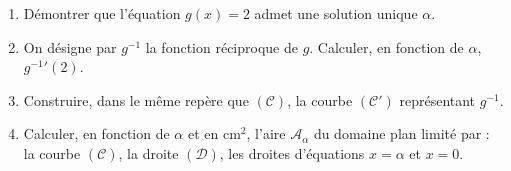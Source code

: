 \begin{enumerate}
                  \begin{enumerate}
                        \item D\'emontrer que l'\'equation $g(x) = 2$ admet une solution unique $\alpha$.
                        \item On d\'esigne par $g^{-1}$ la fonction r\'eciproque de $g$.
                              Calculer, en fonction de $\alpha$, ${g^{-1}}'(2)$.
                        \item Construire, dans le m\^eme rep\`ere que $(\mathscr{C})$, la courbe $(\mathscr{C}')$
                              repr\'esentant $g^{-1}$.
                        \item Calculer, en fonction de $\alpha$ et en $\mathrm{cm}^2$, l'aire $\mathscr{A}_{\alpha}$
                              du domaine plan limit\'e par : 
                              la courbe $(\mathscr{C})$, la droite $(\mathscr{D})$, les droites d'\'equations 
                              $x = \alpha$ et $x = 0$.
                  \end{enumerate}
      \end{enumerate}













